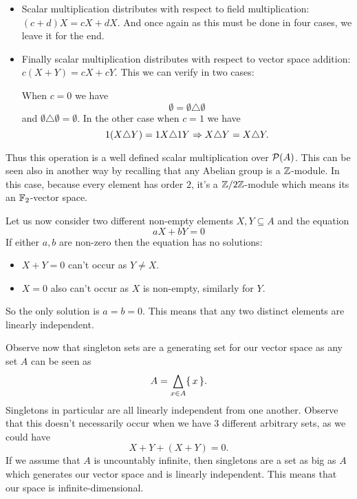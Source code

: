 \documentclass[12pt]{memoir}
\begin{document}
\begin{ptcbr}
\begin{itemize}
    \item Scalar multiplication distributes with respect to field multiplication: $(c+d)X=cX+dX$. And once again as this must be done in four cases, we leave it for the end.
    \item Finally scalar multiplication distributes with respect to vector space addition: $c(X+Y)=cX+cY$. This we can verify in two cases:\par 
    When $c=0$ we have 
    $$\emptyset=\emptyset\triangle\emptyset$$ 
    and $\emptyset\triangle\emptyset=\emptyset$.
    In the other case when $c=1$ we have 
    $$1(X\triangle Y)=1X\triangle1Y\Rightarrow X\triangle Y=X\triangle Y.$$
\end{itemize}
Thus this operation is a well defined scalar multiplication over $\mathcal{P}(A)$. This can be seen also in another way by recalling that any Abelian group is a $\mathbb{Z}$-module. In this case, because every element has order $2$, it's a $\mathbb{Z}/2\mathbb{Z}$-module which means its an $\mathbb{F}_2$-vector space.\par
Let us now consider two different non-empty elements $X,Y\subseteq A$ and the equation 
$$aX+bY=0$$
If either $a,b$ are non-zero then the equation has no solutions:
\begin{itemize}
    \item $X+Y=0$ can't occur as $Y\neq X$.
    \item $X=0$ also can't occur as $X$ is non-empty, similarly for $Y$.
\end{itemize}
So the only solution is $a=b=0$. This means that any two distinct elements are linearly independent.\par 
Observe now that singleton sets are a generating set for our vector space as any set $A$ can be seen as 
$$A=\bigtriangleup_{x\in A}\{\,x\,\}.$$
Singletons in particular are all linearly independent from one another. Observe that this doesn't necessarily occur when we have $3$ different arbitrary sets, as we could have 
$$X+Y+(X+Y)=0.$$
If we assume that $A$ is uncountably infinite, then singletons are a set as big as $A$ which generates our vector space and is linearly independent. This means that our space is infinite-dimensional.
\end{ptcbr}
\end{document}

